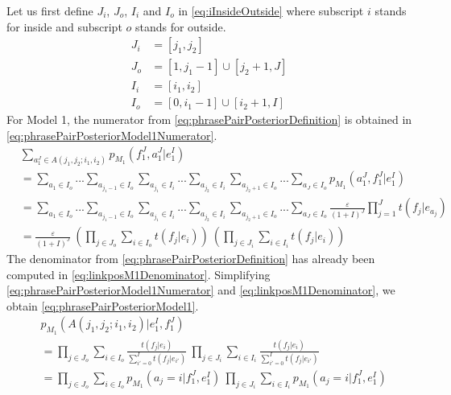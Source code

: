 Let us first define $J_i$, $J_o$, $I_i$ and $I_o$ in \autoref{eq:iInsideOutside}
where subscript $i$ stands for inside and subscript $o$ stands for outside.
%
\begin{equation}
\begin{split}
  J_i &= [j_1, j_2] \\
  J_o &= [1, j_1 - 1] \cup [j_2 + 1, J] \\
  I_i &= [i_1, i_2] \\
  I_o &= [0, i_1 - 1] \cup [i_2 + 1, I]
\end{split}
\label{eq:iInsideOutside}
\end{equation}
%
For Model 1, the numerator from \autoref{eq:phrasePairPosteriorDefinition} is
obtained in \autoref{eq:phrasePairPosteriorModel1Numerator}.
%
\begin{align}
  & \sum_{a_1^J \in A(j_1, j_2; i_1, i_2)} p_{M_1}(f_1^J, a_1^J | e_1^I) \nonumber \\
  &= \sum_{a_1 \in I_o} ... \sum_{a_{j_1-1} \in I_o} \sum_{a_{j_1} \in I_i} ... \sum_{a_{j_2} \in I_i} \sum_{a_{j_2 + 1} \in I_o} ... \sum_{a_J \in I_o} p_{M_1}(a_1^J, f_1^J| e_1^I) \nonumber \\
  &= \sum_{a_1 \in I_o} ... \sum_{a_{j_1-1} \in I_o} \sum_{a_{j_1} \in I_i} ... \sum_{a_{j_2} \in I_i} \sum_{a_{j_2 + 1} \in I_o} ... \sum_{a_J \in I_o} \frac{\varepsilon}{(1+I)^J} \prod_{j = 1}^J t(f_j|e_{a_j}) \nonumber \\
  &= \frac{\varepsilon}{(1+I)^J} \ \left( \prod_{j \in J_o} \sum_{i \in I_o} t(f_j|e_i) \right) \ \left( \prod_{j \in J_i} \sum_{i \in I_i} t(f_j|e_i) \right)
  \label{eq:phrasePairPosteriorModel1Numerator}
\end{align}
%
The denominator from \autoref{eq:phrasePairPosteriorDefinition} has already been
computed in \autoref{eq:linkposM1Denominator}.
Simplifying \autoref{eq:phrasePairPosteriorModel1Numerator} and
\autoref{eq:linkposM1Denominator}, we obtain
\autoref{eq:phrasePairPosteriorModel1}.
%
\begin{align}
  & p_{M_1}(A(j_1, j_2; i_1, i_2) | e_1^I, f_1^J) \nonumber \\
  &= \prod_{j \in J_o} \sum_{i \in I_o} \frac{t(f_j|e_i)}{\sum_{i' = 0}^I t(f_{j}|e_{i'})} \ \prod_{j \in J_i} \sum_{i \in I_i} \frac{t(f_j|e_i)}{\sum_{i' = 0}^I t(f_{j}|e_{i'})} \nonumber \\
  &= \prod_{j \in J_o} \sum_{i \in I_o} p_{M_1}(a_j = i | f_1^J, e_1^I) \ \prod_{j \in J_i} \sum_{i \in I_i} p_{M_1}(a_j = i | f_1^J, e_1^I)
  \label{eq:phrasePairPosteriorModel1}
\end{align}

